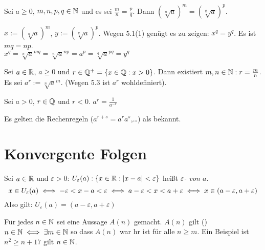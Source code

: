 \documentclass[a4paper,twoside,DIV15,BCOR12mm]{scrbook}
\begin{document}
\begin{satz}
Sei $a\ge 0$, $m,n,p,q \in \mathbb{N}$ und es sei $\frac{m}{n} = \frac{p}{q}$. Dann $(\sqrt[n]{a})^m = (\sqrt[q]{a})^p$.
\end{satz}

\begin{beweis}
$ x := (\sqrt[n]{a})^m$, $y:=(\sqrt[q]{a})^p$. Wegen 5.1(1) genügt es zu zeigen: $x^q = y^q$. Es ist $mq = np$. \\
$x^q = \sqrt[n]{a}^{mq} = \sqrt[n]{a}^{np} = a^p = \sqrt[q]{a}^{pq} = y^q$
\end{beweis}

\begin{definition}
\begin{liste}
\item Sei $a \in \mathbb{R}$, $a \ge 0 $ und $r \in \mathbb{Q}^+ = \{ x \in \mathbb{Q}: x>0\}$. Dann existiert $m,n \in \mathbb{N}: r = \frac{m}{n}$.  Es sei $a^r := \sqrt[n]{a}^m$. (Wegen 5.3 ist $a^r$ wohldefiniert).
\item Sei $a>0$, $r\in\mathbb{Q}$ und $r < 0$. $a^r = \frac{1}{a^{-r}} $
\end{liste}
\end{definition}

Es gelten die Rechenregeln ($a^{r+s} = a^r a^s$,\ldots) als bekannt.

\chapter{Konvergente Folgen}

\begin{definition}[Umgebung]
Sei $a \in \mathbb{R}$ und $\varepsilon > 0$: $U_\varepsilon(a):\{x \in \mathbb{R}: |x-a|<\varepsilon\}$ heißt \textit{$\varepsilon$- von $a$}. \\
$$ x \in U_\varepsilon(a) \iff -\varepsilon < x - a < \varepsilon \iff a - \varepsilon < x < a +  \varepsilon \iff x \in (a-\varepsilon, a+\varepsilon) $$
Also gilt: $U_\varepsilon(a) = (a-\varepsilon, a+\varepsilon)$
\end{definition}

\begin{definition}
Für jedes $n \in \mathbb{N}$ sei eine Aussage $A(n)$ gemacht. $A(n)$ gilt  (\ffa) $n \in \mathbb{N} \iff \exists m \in \mathbb{N} $ so dass $A(n)$ war hr ist für alle $n \ge m$. Ein Beispiel ist $n^2\ge n + 17$ gilt \ffa $n \in \mathbb{N}$.
\end{definition}
\end{document}
